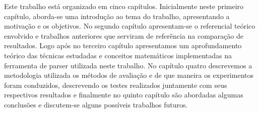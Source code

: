Este trabalho está organizado em cinco capítulos. Inicialmente neste primeiro capítulo, aborda-se uma introdução ao tema do trabalho, apresentando a motivação e os objetivos. No segundo capítulo apresentam-se o referencial teórico envolvido e trabalhos anteriores que serviram de referência na comparação de resultados. Logo após no terceiro capítulo apresentamos um aprofundamento teórico das técnicas estudadas e conceitos matemáticos implementadas na ferramenta de parser utilizada neste trabalho. No capítulo quatro descrevemos a metodologia utilizada os métodos de avaliação e de que maneira os experimentos foram conduzidos, descrevendo os testes realizados juntamente com seus respectivos resultados e finalmente no quinto capítulo são abordadas algumas conclusões e discutem-se alguns possíveis trabalhos futuros.
